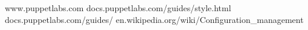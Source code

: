\begin{thebibliography}{99}

www.puppetlabs.com
docs.puppetlabs.com/guides/style.html
docs.puppetlabs.com/guides/
en.wikipedia.org/wiki/Configuration\_management

\end{thebibliography}
